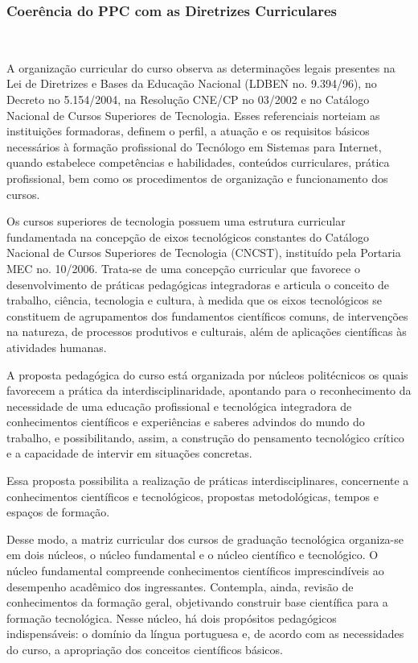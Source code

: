 \subsubsection{Coerência do PPC com as Diretrizes Curriculares}\

	A organização curricular do curso observa as determinações legais presentes na Lei de Diretrizes e Bases da Educação Nacional (LDBEN no. 9.394/96), no Decreto no 5.154/2004, na Resolução CNE/CP no 03/2002 e no Catálogo Nacional de Cursos Superiores de Tecnologia. Esses referenciais norteiam as instituições formadoras, definem o perfil, a atuação e os requisitos básicos necessários à formação profissional do Tecnólogo em Sistemas para Internet, quando estabelece competências e habilidades, conteúdos curriculares, prática profissional, bem como os procedimentos de organização e funcionamento dos cursos.

	Os cursos superiores de tecnologia possuem uma estrutura curricular fundamentada na concepção de eixos tecnológicos constantes do Catálogo Nacional de Cursos Superiores de Tecnologia (CNCST), instituído pela Portaria MEC no. 10/2006. Trata-se de uma concepção curricular que favorece o desenvolvimento de práticas pedagógicas integradoras e articula o conceito de trabalho, ciência, tecnologia e cultura, à medida que os eixos tecnológicos se constituem de agrupamentos dos fundamentos científicos comuns, de intervenções na natureza, de processos produtivos e culturais, além de aplicações científicas às atividades humanas.

	A proposta pedagógica do curso está organizada por núcleos politécnicos os quais favorecem a prática da interdisciplinaridade, apontando para o reconhecimento da necessidade de uma educação profissional e tecnológica integradora de conhecimentos científicos e experiências e saberes advindos do mundo do trabalho, e possibilitando, assim, a construção do pensamento tecnológico crítico e a capacidade de intervir em situações concretas.

	Essa proposta possibilita a realização de práticas interdisciplinares, concernente a conhecimentos científicos e tecnológicos, propostas metodológicas, tempos e espaços de formação.

	Desse modo, a matriz curricular dos cursos de graduação tecnológica organiza-se em dois núcleos, o núcleo fundamental e o núcleo científico e tecnológico. O núcleo fundamental compreende conhecimentos científicos imprescindíveis ao desempenho acadêmico dos ingressantes. Contempla, ainda, revisão de conhecimentos da formação geral, objetivando construir base científica para a formação tecnológica. Nesse núcleo, há dois propósitos pedagógicos indispensáveis: o domínio da língua portuguesa e, de acordo com as necessidades do curso, a apropriação dos conceitos científicos básicos.

